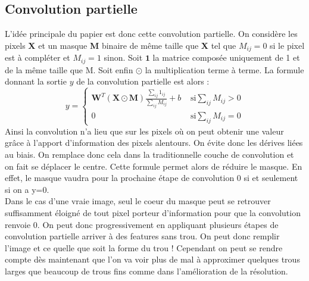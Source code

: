 \subsection{Convolution partielle}
L'idée principale du papier est donc cette convolution partielle. 
On considère les pixels \textbf{X} et un masque \textbf{M} binaire de même taille que \textbf{X} tel que $M_{ij} = 0$ si le pixel est à compléter et $M_{ij} = 1$ sinon. Soit $\textbf{1}$ la matrice composée uniquement de 1 et de la même taille que M. Soit enfin $\odot$ la multiplication terme à terme.
La formule donnant la sortie $y$ de la convolution partielle est alors :
\begin{equation}
    y = \left\{ \begin{array}{ll}
        \textbf{W}^T (\textbf{X} \odot \textbf{M} ) \frac{\sum_{ij} 1_{ij}}{\sum_{ij} M_{ij}}+ b & \mbox{ si} \sum_{ij} M_{ij} > 0 \\
        0 & \mbox{ si} \sum_{ij} M_{ij} = 0
        \end{array}
        \right.
\end{equation}
Ainsi la convolution n'a lieu que sur les pixels où on peut obtenir une valeur grâce à l'apport d'information des pixels alentours. On évite donc les dérives liées au biais. On remplace donc cela dans la traditionnelle couche de convolution et on fait se déplacer le centre. Cette formule permet alors de réduire le masque. En effet, le masque vaudra pour la prochaine étape de convolution 0 si et seulement si on a y=0.\\
Dans le cas d'une vraie image, seul le coeur du masque peut se retrouver suffisamment éloigné de tout pixel porteur d'information pour que la convolution renvoie 0. On peut donc progressivement en appliquant plusieurs étapes de convolution partielle arriver à des features sans trou. On peut donc remplir l'image et ce quelle que soit la forme du trou ! Cependant on peut se rendre compte dès maintenant que l'on va voir plus de mal à approximer quelques trous larges que beaucoup de trous fins comme dans l'amélioration de la résolution.

